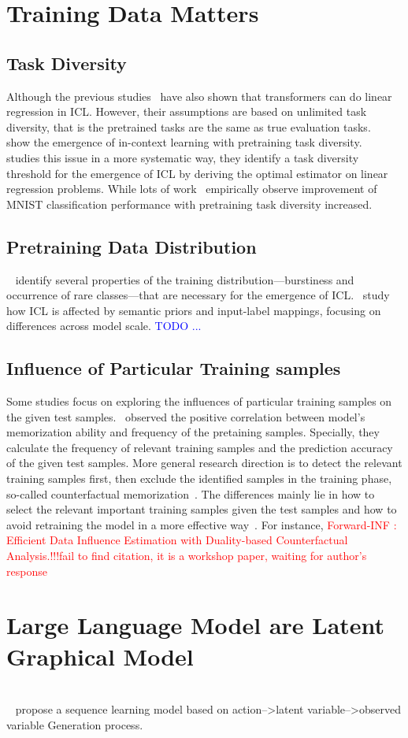\section{Training Data Matters}
\subsection{Task Diversity}
Although the previous studies~\cite{dai2023can,DBLP:conf/iclr/AkyurekSA0Z23,von2023transformers} have also shown that transformers can do linear regression in ICL. However, their assumptions are based on unlimited task diversity, that is the pretrained tasks are the same as true evaluation tasks. ~\cite{DBLP:journals/corr/abs-2212-04458,DBLP:journals/corr/abs-2306-15063} show the emergence of in-context learning with pretraining task diversity.~\cite{DBLP:journals/corr/abs-2212-04458} studies this issue in a more systematic way, they identify a task diversity threshold for the emergence of ICL by deriving the optimal estimator on linear regression problems. While lots of work~\cite{DBLP:journals/corr/abs-2306-15063} empirically observe improvement of MNIST classification performance with pretraining task diversity increased. 

\subsection{Pretraining Data Distribution}
~\citet{DBLP:conf/nips/ChanSLWSRMH22} identify several properties of the training distribution—burstiness and occurrence of rare classes—that are necessary for the emergence of ICL.~\citet{DBLP:journals/corr/abs-2303-03846} study how ICL is affected by semantic priors and input-label mappings, focusing on differences across model scale.
\textcolor{blue}{TODO ...}
\subsection{Influence of Particular Training samples}
Some studies focus on exploring the influences of particular training samples on the given test samples.~\citet{DBLP:conf/icml/KandpalDRWR23} observed the positive correlation between model's memorization ability and frequency of the pretaining samples. Specially, they calculate the frequency of relevant training samples and the prediction accuracy of the given test samples. More general research direction is to detect the relevant training samples first, then exclude the identified samples in the training phase, so-called counterfactual memorization~\cite{Zhang2021CounterfactualMI,}. The differences mainly lie in how to select the relevant important training samples given the test samples and how to avoid retraining the model in a more effective way~\cite{}.
For instance, \textcolor{red}{Forward-INF : Efficient Data Influence Estimation with Duality-based  Counterfactual Analysis.!!!fail to find citation, it is a workshop paper, waiting for author's response} 

\section{Large Language Model are Latent Graphical Model}
~\cite{Xie2021AnEO} \\

~\cite{swaminathan2023schema} propose a sequence learning model based on action-->latent variable-->observed variable Generation process.

~\cite{DBLP:journals/corr/abs-2304-09960} \\